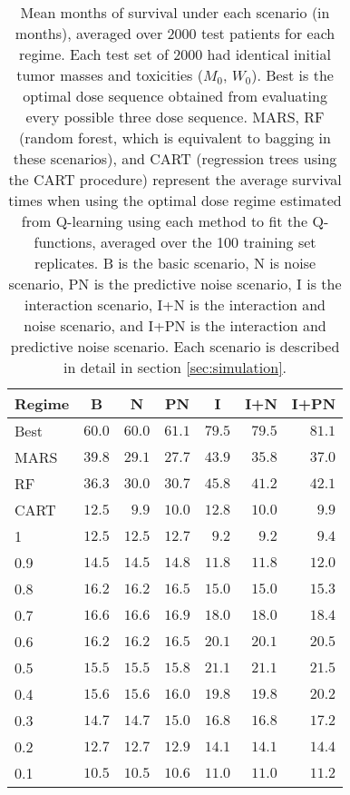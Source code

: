 \documentclass[12pt]{article}
\begin{document}
\begin{table}[!htbp]
  \caption[Mean survival times under each scenario]{Mean months of survival under each scenario (in months), averaged over 2000 test patients for each regime. Each test set of 2000 had identical initial tumor masses and toxicities ($M_{0}$, $W_{0}$). Best is the optimal dose sequence obtained from evaluating every possible three dose sequence. MARS, RF (random forest, which is equivalent to bagging in these scenarios), and CART (regression trees using the CART procedure) represent the average survival times when using the optimal dose regime estimated from Q-learning using each method to fit the Q-functions, averaged over the 100 training set replicates. B is the basic scenario, N is noise scenario, PN is the predictive noise scenario, I is the interaction scenario, I+N is the interaction and noise scenario, and I+PN is the interaction and predictive noise scenario. Each scenario is described in detail in section \ref{sec:simulation}.\label{tab:rewards}}

\centering
\begin{tabular}{lrrrrrr}
\toprule
\multicolumn{1}{c}{Regime}&\multicolumn{1}{c}{B}&\multicolumn{1}{c}{N}&\multicolumn{1}{c}{PN}&\multicolumn{1}{c}{I}&\multicolumn{1}{c}{I+N}&\multicolumn{1}{c}{I+PN}\tabularnewline
\midrule
Best&$60.0$&$60.0$&$61.1$&$79.5$&$79.5$&$81.1$\tabularnewline
MARS&$39.8$&$29.1$&$27.7$&$43.9$&$35.8$&$37.0$\tabularnewline
RF&$36.3$&$30.0$&$30.7$&$45.8$&$41.2$&$42.1$\tabularnewline
CART&$12.5$&$ 9.9$&$10.0$&$12.8$&$10.0$&$ 9.9$\tabularnewline
1&$12.5$&$12.5$&$12.7$&$ 9.2$&$ 9.2$&$ 9.4$\tabularnewline
0.9&$14.5$&$14.5$&$14.8$&$11.8$&$11.8$&$12.0$\tabularnewline
0.8&$16.2$&$16.2$&$16.5$&$15.0$&$15.0$&$15.3$\tabularnewline
0.7&$16.6$&$16.6$&$16.9$&$18.0$&$18.0$&$18.4$\tabularnewline
0.6&$16.2$&$16.2$&$16.5$&$20.1$&$20.1$&$20.5$\tabularnewline
0.5&$15.5$&$15.5$&$15.8$&$21.1$&$21.1$&$21.5$\tabularnewline
0.4&$15.6$&$15.6$&$16.0$&$19.8$&$19.8$&$20.2$\tabularnewline
0.3&$14.7$&$14.7$&$15.0$&$16.8$&$16.8$&$17.2$\tabularnewline
0.2&$12.7$&$12.7$&$12.9$&$14.1$&$14.1$&$14.4$\tabularnewline
0.1&$10.5$&$10.5$&$10.6$&$11.0$&$11.0$&$11.2$\tabularnewline
  \bottomrule
\end{tabular}
\end{table}
\end{document}
